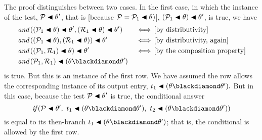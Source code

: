 \documentclass[runningheads]{llncs}
\DeclareMathOperator{\uand}{\emph{and}\,}
\DeclareMathOperator{\uiff}{\iff}
\begin{document}
The proof distinguishes between two cases.  In the first case, in which the instance of the test, 
$\mathcal{P}\blacktriangleleft \theta'$, that is
[because $\mathcal{P} = 
{\mathcal{P}}_{1} \blacktriangleleft \theta)$],
$({{\mathcal{P}}_{1} \blacktriangleleft \theta})\blacktriangleleft \theta'$, is true, we have
\begin{align*}
&\uand(({\expsub{\mathcal{P}}{1} \apply \theta})\apply \theta',
(\expsub{\mathcal{R}}{1}\apply \theta)\apply \theta'
)  \, &&\uiff 
  \text{[by distributivity]} \\
&\uand(({\expsub{\mathcal{P}}{1} \apply \theta}),
(\expsub{\mathcal{R}}{1}\apply \theta))\apply \theta' \, &&\uiff 
   \text{[by distributivity, again]} \\
  &\uand(({\expsub{\mathcal{P}}{1}},
\expsub{\mathcal{R}}{1})\apply \theta) \apply \theta' \, &&\uiff  
 \text{[by the composition property]} \\
&\uand({\expsub{\mathcal{P}}{1}},
\expsub{\mathcal{R}}{1})\apply (\theta \compose \theta')
   \end{align*}
is true.  But this is an instance of the first row.  We have assumed the row allows the corresponding instance of its output entry, $\expsub{t}{1} \apply (\theta \compose \theta').$ But in this case, because the test
$\mathcal{P}\blacktriangleleft \theta'$ is true, the conditional answer \[\cond 
     {\mathcal{P}\apply \theta'} 
     {\expsub{t}{1} \apply (\theta \compose \theta')} 
     {\expsub{t}{2} \apply (\theta \compose \theta')}\] is equal to its then-branch $\expsub{t}{1} \apply (\theta \compose \theta')$;  that is, the conditional is allowed by the first row.
    
\end{document}
